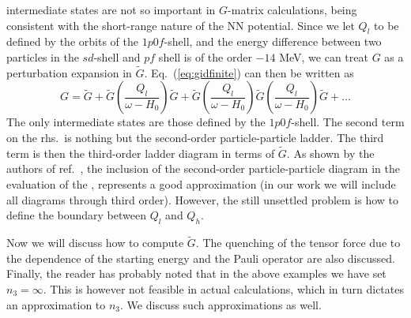 intermediate states are not so important in $G$-matrix calculations,
being consistent with the short-range nature of the NN potential.
Since we let $Q_l$ to be defined by the orbits of the $1p0f$-shell,
and the energy difference between two particles in the 
$sd$-shell and $pf$ shell is of the order $-14$ MeV, we can treat 
$G$ as a perturbation expansion in $\tilde{G}$.
Eq.\ (\ref{eq:gidfinite}) can then be written as 
\begin{equation}
        G=\tilde{G} +\tilde{G}
        \left(\frac{Q_l}{\omega -H_0}\right)\tilde{G}
        +\tilde{G}
        \left(\frac{Q_l}{\omega -H_0}\right)\tilde{G}
        \left(\frac{Q_l}{\omega -H_0}\right)\tilde{G} +\dots
\end{equation}
The only intermediate states are those defined by the $1p0f$-shell.
The second term on the rhs.\ is nothing but the second-order 
particle-particle ladder. The third term is then the third-order ladder
diagram in terms of
$\tilde{G}$. As shown by the authors of ref.\ \cite{kkko76}, the inclusion
of the second-order particle-particle diagram in the evaluation
of the \qbox, represents a good approximation (in our work we will
include all diagrams through third order).
However,
the still unsettled problem is how to define
the boundary between 
$Q_l$ and $Q_h$. 



Now we will discuss how to compute $\tilde{G}$. The quenching
of the tensor force  
due to the dependence of the starting
energy and the Pauli operator are also discussed. Finally, the reader
has probably noted that in the above examples we have set 
$n_3=\infty$. This is however not feasible in actual calculations, which
in turn dictates an approximation to $n_3$. We discuss such approximations as
well.

